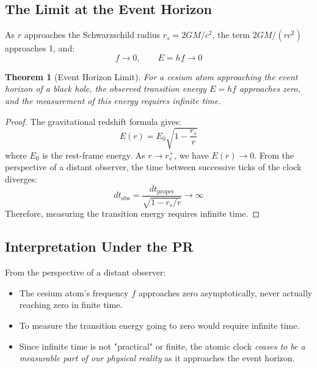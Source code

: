 \documentclass[aps,preprint,showpacs,showkeys]{revtex4}%
\newtheorem{theorem}{Theorem}
\begin{document}
\subsection{The Limit at the Event Horizon}

As $r$ approaches the Schwarzschild radius $r_s = 2GM/c^2$, the term $%
2GM/(rc^2)$ approaches 1, and: 
\begin{equation}
f \rightarrow 0, \qquad E = hf \rightarrow 0
\end{equation}

\begin{theorem}[Event Horizon Limit]
For a cesium atom approaching the event horizon of a black hole, the
observed transition energy $E = hf$ approaches zero, and the measurement of
this energy requires infinite time.
\end{theorem}

\begin{proof}
The gravitational redshift formula gives:
\begin{equation}
E(r) = E_0 \sqrt{1 - \frac{r_s}{r}}
\end{equation}
where $E_0$ is the rest-frame energy. As $r \rightarrow r_s^+$, we have $E(r) \rightarrow 0$. From the perspective of a distant observer, the time between successive ticks of the clock diverges:
\begin{equation}
dt_{\text{obs}} = \frac{dt_{\text{proper}}}{\sqrt{1 - r_s/r}} \rightarrow \infty
\end{equation}
Therefore, measuring the transition energy requires infinite time.
\end{proof}

\subsection{Interpretation Under the PR}

From the perspective of a distant observer:

\begin{itemize}
\item The cesium atom's frequency $f$ approaches zero asymptotically, never
actually reaching zero in finite time.

\item To measure the transition energy going to zero would require infinite
time.

\item Since infinite time is not "practical" or finite, the atomic clock 
\emph{ceases to be a measurable part of our physical reality} as it
approaches the event horizon.
\end{itemize}
\end{document}
